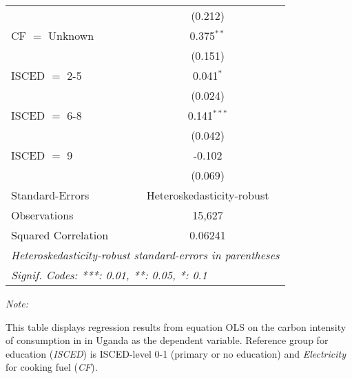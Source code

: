 \begin{table}[htbp!]
\begin{adjustbox}{width = 1\textwidth, max height = 0.95\textheight, center}
\begin{threeparttable}[b]
\begin{tabular}{lc}
                                & (0.212)\\   
            CF $=$ Unknown      & 0.375$^{**}$\\   
                                & (0.151)\\   
            ISCED $=$ 2-5       & 0.041$^{*}$\\   
                                & (0.024)\\   
            ISCED $=$ 6-8       & 0.141$^{***}$\\   
                                & (0.042)\\   
            ISCED $=$ 9         & -0.102\\   
                                & (0.069)\\   
            \midrule 
            Standard-Errors     & Heteroskedasticity-robust \\   
            Observations        & 15,627\\  
            Squared Correlation & 0.06241\\  
            \midrule \midrule
            \multicolumn{2}{l}{\emph{Heteroskedasticity-robust standard-errors in parentheses}}\\
            \multicolumn{2}{l}{\emph{Signif. Codes: ***: 0.01, **: 0.05, *: 0.1}}\\
         \end{tabular}
         
         \begin{tablenotes}\item \medskip \textit{Note:}
            \item This table displays regression results from equation OLS on the carbon intensity of consumption in  in Uganda as the dependent variable. Reference group for education (\textit{ISCED}) is ISCED-level 0-1 (primary or no education) and \textit{Electricity} for cooking fuel (\textit{CF}).
         \end{tablenotes}
      \end{threeparttable}
   \end{adjustbox}
\end{table}



